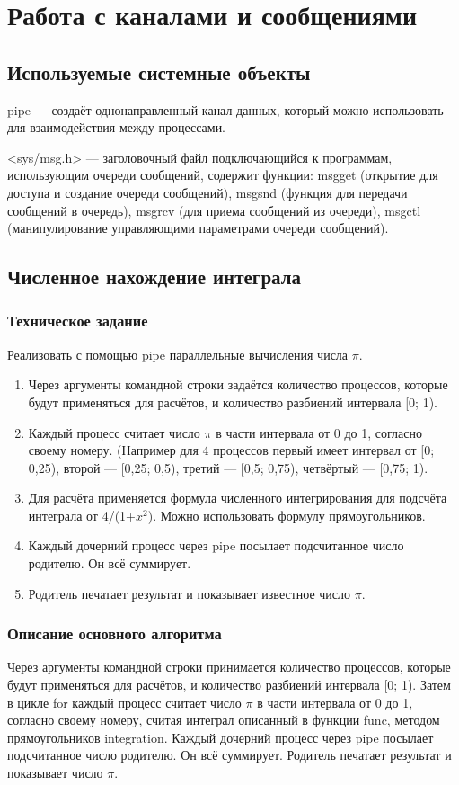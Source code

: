 \documentclass[a4paper,12pt]{extarticle}
\begin{document}
\newpage

\section{Работа с каналами и сообщениями}
\subsection{Используемые системные объекты}
pipe ---  создаёт однонаправленный канал данных, который можно использовать для взаимодействия между процессами.

<sys/msg.h> ---  заголовочный файл подключающийся к программам, использующим очереди сообщений, содержит функции: msgget (открытие для доступа и создание очереди сообщений), msgsnd (функция для передачи сообщений в очередь), msgrcv (для приема сообщений из очереди), msgctl (манипулирование управляющими параметрами очереди сообщений).

\subsection{Численное нахождение интеграла}
\subsubsection{Техническое задание}
Реализовать с помощью pipe параллельные вычисления числа $\pi$.
\begin{enumerate} 
  \item Через аргументы командной строки задаётся количество процессов, которые будут применяться для расчётов, и количество разбиений интервала [0; 1).
  \item  Каждый процесс считает число $\pi$ в части интервала от 0 до 1, согласно своему номеру. (Например для 4 процессов первый имеет интервал от [0; 0,25), второй --- [0,25; 0,5), третий --- [0,5; 0,75), четвёртый --- [0,75; 1).
  \item Для расчёта применяется формула численного интегрирования для подсчёта интеграла от 4/(1+$x^2$). Можно использовать формулу прямоугольников.
  \item Каждый дочерний процесс через pipe посылает подсчитанное число родителю. Он всё суммирует.
  \item Родитель печатает результат и показывает известное число $\pi$.
\end{enumerate}

\subsubsection{Описание основного алгоритма}
Через аргументы командной строки принимается количество процессов, которые будут применяться для расчётов, и количество разбиений интервала [0; 1). Затем в цикле for каждый процесс считает число $\pi$ в части интервала от 0 до 1, согласно своему номеру, считая интеграл описанный в функции func, методом прямоугольников integration. Каждый дочерний процесс через pipe посылает подсчитанное число родителю. Он всё суммирует. Родитель печатает результат и показывает число $\pi$.
\end{document}
